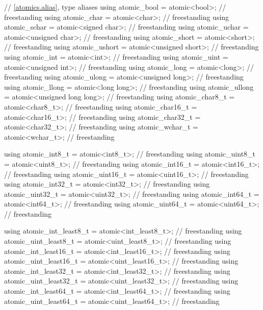 \begin{codeblock}
{  // \ref{atomics.alias}, type aliases
  using atomic_bool           = atomic<bool>;                                       // freestanding
  using atomic_char           = atomic<char>;                                       // freestanding
  using atomic_schar          = atomic<signed char>;                                // freestanding
  using atomic_uchar          = atomic<unsigned char>;                              // freestanding
  using atomic_short          = atomic<short>;                                      // freestanding
  using atomic_ushort         = atomic<unsigned short>;                             // freestanding
  using atomic_int            = atomic<int>;                                        // freestanding
  using atomic_uint           = atomic<unsigned int>;                               // freestanding
  using atomic_long           = atomic<long>;                                       // freestanding
  using atomic_ulong          = atomic<unsigned long>;                              // freestanding
  using atomic_llong          = atomic<long long>;                                  // freestanding
  using atomic_ullong         = atomic<unsigned long long>;                         // freestanding
  using atomic_char8_t        = atomic<char8_t>;                                    // freestanding
  using atomic_char16_t       = atomic<char16_t>;                                   // freestanding
  using atomic_char32_t       = atomic<char32_t>;                                   // freestanding
  using atomic_wchar_t        = atomic<wchar_t>;                                    // freestanding

  using atomic_int8_t         = atomic<int8_t>;                                     // freestanding
  using atomic_uint8_t        = atomic<uint8_t>;                                    // freestanding
  using atomic_int16_t        = atomic<int16_t>;                                    // freestanding
  using atomic_uint16_t       = atomic<uint16_t>;                                   // freestanding
  using atomic_int32_t        = atomic<int32_t>;                                    // freestanding
  using atomic_uint32_t       = atomic<uint32_t>;                                   // freestanding
  using atomic_int64_t        = atomic<int64_t>;                                    // freestanding
  using atomic_uint64_t       = atomic<uint64_t>;                                   // freestanding

  using atomic_int_least8_t   = atomic<int_least8_t>;                               // freestanding
  using atomic_uint_least8_t  = atomic<uint_least8_t>;                              // freestanding
  using atomic_int_least16_t  = atomic<int_least16_t>;                              // freestanding
  using atomic_uint_least16_t = atomic<uint_least16_t>;                             // freestanding
  using atomic_int_least32_t  = atomic<int_least32_t>;                              // freestanding
  using atomic_uint_least32_t = atomic<uint_least32_t>;                             // freestanding
  using atomic_int_least64_t  = atomic<int_least64_t>;                              // freestanding
  using atomic_uint_least64_t = atomic<uint_least64_t>;                             // freestanding

}
\end{codeblock}
